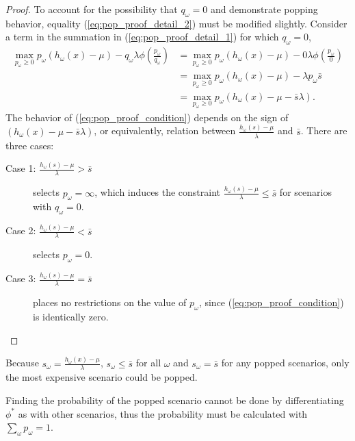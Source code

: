 \documentclass[ijoc,letterpaper]{informs3} %
\begin{document}
\begin{proof}
	To account for the possibility that $q_\omega = 0$ and demonstrate popping behavior, equality (\ref{eq:pop_proof_detail_2}) must be modified slightly.
	Consider a term in the summation in (\ref{eq:pop_proof_detail_1}) for which $q_\omega = 0$,
	\begin{align}
		\max_{p_\omega \geq 0} p_\omega (h_\omega(x) - \mu) - q_\omega \lambda \phi\left(\frac{p_\omega}{q_\omega}\right) & = \max_{p_\omega \geq 0} p_\omega (h_\omega(x) - \mu) - 0 \lambda \phi\left(\frac{p_\omega}{0}\right) \nonumber \\
		& = \max_{p_\omega \geq 0} p_\omega (h_\omega(x) - \mu) - \lambda p_\omega \bar{s} \nonumber \\
		& = \max_{p_\omega \geq 0} p_\omega \left( h_\omega(x) - \mu - \bar{s} \lambda \right). \label{eq:pop_proof_condition}
	\end{align}
	The behavior of (\ref{eq:pop_proof_condition}) depends on the sign of $\left( h_\omega(x) - \mu - \bar{s} \lambda \right)$, or equivalently, relation between $\frac{h_\omega(s) - \mu}{\lambda}$ and $\bar{s}$.
	There are three cases:
	\begin{description}
		\item[Case 1: $\frac{h_\omega(s) - \mu}{\lambda} > \bar{s}$] selects $p_\omega = \infty$, which induces the constraint $\frac{h_\omega(s) - \mu}{\lambda} \leq \bar{s}$ for scenarios with $q_\omega = 0$.
		\item[Case 2: $\frac{h_\omega(s) - \mu}{\lambda} < \bar{s}$] selects $p_\omega = 0$.
		\item[Case 3: $\frac{h_\omega(s) - \mu}{\lambda} = \bar{s}$] places no restrictions on the value of $p_\omega$, since (\ref{eq:pop_proof_condition}) is identically zero. %
	\end{description}
\end{proof}

\begin{remark}
	Because $s_\omega = \frac{h_\omega(x) - \mu}{\lambda}$, $s_\omega \leq \bar{s}$ for all $\omega$ and $s_\omega = \bar{s}$ for any popped scenarios, only the most expensive scenario could be popped.
\end{remark}

\begin{remark}
	Finding the probability of the popped scenario cannot be done by differentiating $\phi^*$ as with other scenarios, thus the probability must be calculated with $\sum_\omega p_\omega = 1$.
\end{remark}
\end{document}
